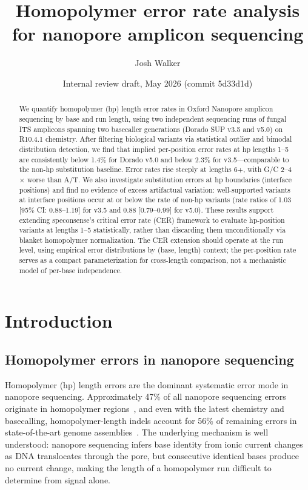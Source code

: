 \documentclass[11pt]{article}
\title{Homopolymer error rate analysis for nanopore amplicon sequencing}
\author{Josh Walker}
\date{Internal review draft, May 2026 (commit 5d33d1d)}
\begin{document}
\maketitle
\linenumbers

\begin{abstract}
We quantify homopolymer (hp) length error rates in Oxford Nanopore amplicon
sequencing by base and run length, using two independent sequencing runs of
fungal ITS amplicons spanning two basecaller generations (Dorado SUP v3.5 and
v5.0) on R10.4.1 chemistry. After filtering biological variants via
statistical outlier and bimodal distribution detection, we find that implied
per-position error rates at hp lengths 1--5 are consistently below 1.4\% for
Dorado v5.0 and below 2.3\% for v3.5---comparable to the non-hp substitution
baseline. Error rates rise steeply at lengths 6+, with G/C 2--4$\times$ worse
than A/T. We also investigate substitution errors at hp boundaries (interface
positions) and find no evidence of excess artifactual variation: well-supported
variants at interface positions occur at or below the rate of non-hp variants
(rate ratios of 1.03 [95\% CI: 0.88--1.19] for v3.5 and 0.88 [0.79--0.99] for
v5.0). These results support extending
speconsense's critical error rate (CER) framework to evaluate hp-position
variants at lengths 1--5 statistically, rather than discarding them
unconditionally via blanket homopolymer normalization. The CER extension should
operate at the run level, using empirical error distributions by (base, length)
context; the per-position rate serves as a compact parameterization for
cross-length comparison, not a mechanistic model of per-base independence.
\end{abstract}

\section{Introduction}

\subsection{Homopolymer errors in nanopore sequencing}

Homopolymer (hp) length errors are the dominant systematic error mode in
nanopore sequencing. Approximately 47\% of all nanopore sequencing errors
originate in homopolymer regions~\cite{delahaye2021}, and even with the latest
chemistry and basecalling, homopolymer-length indels account for 56\% of
remaining errors in state-of-the-art genome assemblies~\cite{wick2025}. The
underlying mechanism is well understood: nanopore sequencing infers base
identity from ionic current changes as DNA translocates through the pore, but
consecutive identical bases produce no current change, making the length of a
homopolymer run difficult to determine from signal alone.
\end{document}
